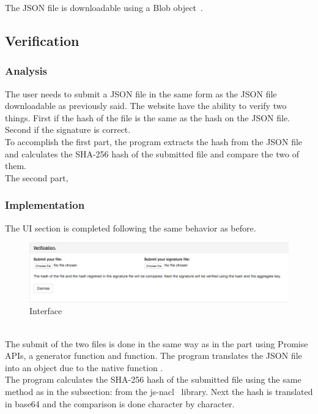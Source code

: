 \documentclass[11pt, a4paper, twoside, openright, openany]{book} %
\begin{document}
The JSON file is downloadable using a Blob object~\cite{blob}.

\subsection{Verification}

\subsubsection{Analysis}
The user needs to submit a JSON file in the same form as the JSON file downloadable
as previously said. The website have the ability to verify two things.
First if the hash of the file is the same as the hash on the JSON file. Second if the signature
is correct.\\
To accomplish the first part, the program extracts the hash from the JSON file and
calculates the SHA-256 hash of the submitted file and compare the two of them.\\
The second part, %

\subsubsection{Implementation}
The UI section is completed following the same behavior as before.\\

\begin{figure}[ht!]
\centering
\includegraphics[width=125mm]{verification_verification.jpg}
\caption{Interface}
\end{figure}
\leavevmode \\

The submit of the two files is done in the same way as in the  part
using Promise APIs, a generator function and  function.
The program translates the JSON file into an object due to the native function .\\
The program calculates the SHA-256 hash of the submitted file using the same method as in the
subsection:  from the js-nacl~\cite{jsnacl} library.
Next the hash is translated in base64 and the comparison is done character by character.\\
\end{document}
